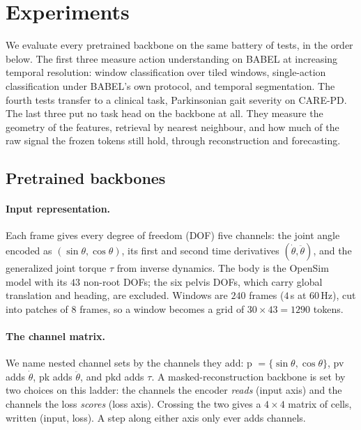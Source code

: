 
\section{Experiments}
\label{sec:experiments}

We evaluate every pretrained backbone on the same battery of tests, in the order below. The
first three measure action understanding on BABEL at increasing temporal resolution:
window classification over tiled windows, single-action classification under BABEL's own
protocol, and temporal segmentation. The fourth tests transfer to a clinical task, Parkinsonian gait severity on
CARE-PD. The last three put no task head on the backbone at all. They measure the geometry
of the features, retrieval by nearest neighbour, and how much of the raw signal the frozen
tokens still hold, through reconstruction and forecasting.

\subsection{Pretrained backbones}
\label{sec:exp-backbones}

\paragraph{Input representation.} Each frame gives every degree of freedom (DOF) five
channels: the joint angle encoded as $(\sin\theta,\cos\theta)$, its first and second time
derivatives $(\dot\theta,\ddot\theta)$, and the generalized joint torque $\tau$ from inverse
dynamics. The body is the OpenSim model with its $43$ non-root DOFs; the six pelvis DOFs,
which carry global translation and heading, are excluded. Windows are $240$ frames
($4$\,s at $60$\,Hz), cut into patches of $8$ frames, so a window becomes a grid of
$30 \times 43 = 1290$ tokens.

\paragraph{The channel matrix.} We name nested channel sets by the channels they add:
\textsf{p} $=\{\sin\theta,\cos\theta\}$, \textsf{pv} adds $\dot\theta$, \textsf{pk} adds
$\ddot\theta$, and \textsf{pkd} adds $\tau$. A masked-reconstruction backbone is set by two
choices on this ladder: the channels the encoder \emph{reads} (input axis) and the channels
the loss \emph{scores} (loss axis). Crossing the two gives a $4\times4$ matrix of cells,
written (input, loss). A step along either axis only ever adds channels.

